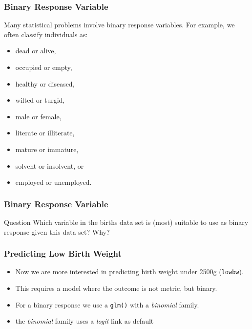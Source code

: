 \begin{frame}\frametitle{Binary Response Variable}
Many statistical problems involve binary response variables. For example, we often classify individuals as:
\begin{itemize}
\item dead or alive,
\item occupied or empty,
\item healthy or diseased,
\item wilted or turgid,
\item male or female,
\item literate or illiterate,
\item mature or immature,
\item solvent or insolvent, or
\item employed or unemployed.
\end{itemize}
\end{frame}

\begin{frame}\frametitle{Binary Response Variable}
\begin{block}{Question}
Which variable in the births data set is (most) suitable to use as binary response given this data set? Why?
\end{block}
\end{frame}


\begin{frame}[fragile]\frametitle{Predicting Low Birth Weight}
\begin{itemize}
\item Now we are more interested in predicting birth weight under 2500g (\texttt{lowbw}). 
\item This requires a model where the outcome is not metric, but binary. 
\item For a binary response we use a \texttt{glm()} with a \emph{binomial} family.
\item the \emph{binomial} family uses  a \emph{logit} link as default
\end{itemize}
\end{frame}


